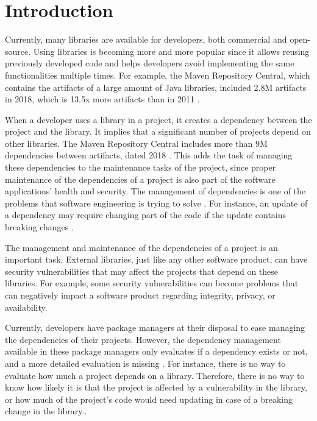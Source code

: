 \chapter{Introduction}\label{ch:Introduction}

Currently, many libraries are available for developers, both commercial and open-source. Using libraries is becoming more and more popular \cite{kikas2017structure} since it allows reusing previously developed code and helps developers avoid implementing the same functionalities multiple times. For example, the Maven Repository Central, which contains the artifacts of a large amount of Java libraries, included 2.8M artifacts in 2018, which is 13.5x more artifacts than in 2011  \cite{Benelallam2019}.

When a developer uses a library in a project, it creates a dependency between the project and the library. It implies that a significant number of projects depend on other libraries. The Maven Repository Central includes more than 9M dependencies between artifacts, dated 2018 \cite{Benelallam2019}. This adds the task of managing these dependencies to the maintenance tasks of the project, since proper maintenance of the dependencies of a project is also part of the software applications' health and security. The management of dependencies is one of the problems that software engineering is trying to solve \cite{kula2014visualizing}. For instance, an update of a dependency may require changing part of the code if the update contains breaking changes \cite{Raemaekers2017}.

The management and maintenance of the dependencies of a project is an important task. External libraries, just like any other software product, can have security vulnerabilities that may affect the projects that depend on these libraries. For example, some security vulnerabilities can become problems that can negatively impact a software product regarding integrity, privacy, or availability.

\blankl
Currently, developers have package managers at their disposal to ease managing the dependencies of their projects. However, the dependency management available in these package managers only evaluates if a dependency exists or not, and a more detailed evaluation is missing \cite{hejderup2018prazi}. For instance, there is no way to evaluate how much a project depends on a library. Therefore, there is no way to know how likely it is that the project is affected by a vulnerability in the library, or how much of the project's code would need updating in case of a breaking change in the library..

